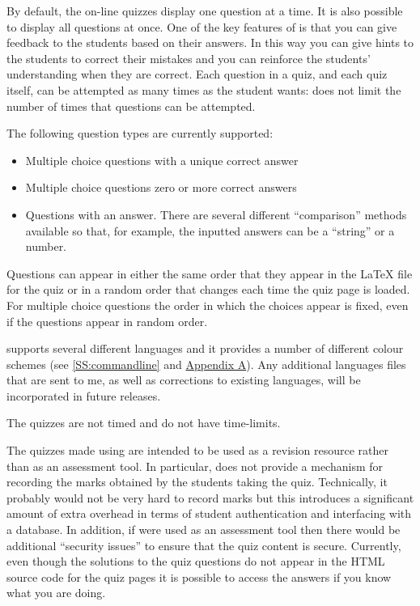 \documentclass[svgnames]{article}
\begin{document}
    By default, the on-line quizzes display one question at a time.  It
    is also possible to display all questions at once. One of the key
    features of \WebQuiz is that you can give feedback to the students
    based on their answers. In this way you can give hints to the
    students to correct their mistakes and you can reinforce the
    students' understanding when they are correct. Each question in a
    quiz, and each quiz itself, can be attempted as many times as the
    student wants: \WebQuiz does not limit the number of times that
    questions can be attempted.

    The following question types are currently supported:
    \begin{itemize}
      \item Multiple choice questions with a unique correct answer
      \item Multiple choice questions zero or more correct answers
      \item Questions with an answer. There are several different
      ``comparison'' methods available so that, for example, the
      inputted answers can be a ``string'' or a number.
    \end{itemize}

    Questions can appear in either the same order that they appear in
    the \LaTeX{} file for the quiz or in a random order that changes
    each time the quiz page is loaded. For multiple choice questions the
    order in which the choices appear is fixed, even if the questions
    appear in random order.

    \WebQuiz supports several different languages and it
    provides a number of different colour schemes (see
    \autoref{SS:commandline} and \hyperref[SS:themes]{Appendix A}). Any additional
    languages files that are sent to me, as well as corrections to
    existing languages, will be incorporated in future releases.

    The quizzes are not timed and do not have time-limits.

    The quizzes made using \WebQuiz are intended to be used as a
    revision resource rather than as an assessment tool. In particular,
    \WebQuiz does not provide a mechanism for recording the marks
    obtained by the students taking the quiz. Technically, it probably
    would not be very hard to record marks but this introduces a
    significant amount of extra overhead in terms of student
    authentication and interfacing with a database. In addition, if
    \WebQuiz were used as an assessment tool then there would be
    additional ``security issues'' to ensure that the quiz content is
    secure. Currently, even though the solutions to the quiz questions
    do not appear in the HTML source code for the quiz pages it is
    possible to access the answers if you know what you are doing.
\end{document}
